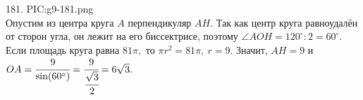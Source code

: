 181. {{PIC:g9-181.png}}\\
Опустим из центра круга $A$ перпендикуляр $AH.$ Так как центр круга равноудалён от сторон угла, он лежит на его биссектрисе, поэтому $\angle AOH=120^\circ:2=60^\circ.$ Если площадь круга равна $81\pi,$ то $\pi r^2=81\pi,\ r=9.$ Значит, $AH=9$ и $OA=\cfrac{9}{\sin(60^\circ)}=\cfrac{9}{\cfrac{\sqrt{3}}{2}}=6\sqrt{3}.$\\
